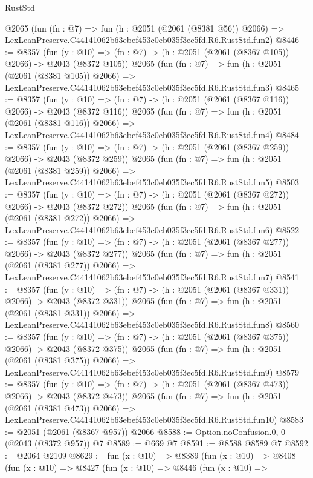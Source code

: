 \begin{lexlean}{RustStd}
\begin{coremodule}
    @2065
    (fun (fn : @7) =>
    fun (h : @2051 (@2061 (@8381 @56)) @2066) =>
    LexLeanPreserve.C44141062b63ebef453c0eb035f3ec5fd.R6.RustStd.fun2)
@8446 := @8357
    (fun (y : @10) => (fn : @7) -> (h : @2051 (@2061 (@8367 @105)) @2066) -> @2043 (@8372 @105))
    @2065
    (fun (fn : @7) =>
    fun (h : @2051 (@2061 (@8381 @105)) @2066) =>
    LexLeanPreserve.C44141062b63ebef453c0eb035f3ec5fd.R6.RustStd.fun3)
@8465 := @8357
    (fun (y : @10) => (fn : @7) -> (h : @2051 (@2061 (@8367 @116)) @2066) -> @2043 (@8372 @116))
    @2065
    (fun (fn : @7) =>
    fun (h : @2051 (@2061 (@8381 @116)) @2066) =>
    LexLeanPreserve.C44141062b63ebef453c0eb035f3ec5fd.R6.RustStd.fun4)
@8484 := @8357
    (fun (y : @10) => (fn : @7) -> (h : @2051 (@2061 (@8367 @259)) @2066) -> @2043 (@8372 @259))
    @2065
    (fun (fn : @7) =>
    fun (h : @2051 (@2061 (@8381 @259)) @2066) =>
    LexLeanPreserve.C44141062b63ebef453c0eb035f3ec5fd.R6.RustStd.fun5)
@8503 := @8357
    (fun (y : @10) => (fn : @7) -> (h : @2051 (@2061 (@8367 @272)) @2066) -> @2043 (@8372 @272))
    @2065
    (fun (fn : @7) =>
    fun (h : @2051 (@2061 (@8381 @272)) @2066) =>
    LexLeanPreserve.C44141062b63ebef453c0eb035f3ec5fd.R6.RustStd.fun6)
@8522 := @8357
    (fun (y : @10) => (fn : @7) -> (h : @2051 (@2061 (@8367 @277)) @2066) -> @2043 (@8372 @277))
    @2065
    (fun (fn : @7) =>
    fun (h : @2051 (@2061 (@8381 @277)) @2066) =>
    LexLeanPreserve.C44141062b63ebef453c0eb035f3ec5fd.R6.RustStd.fun7)
@8541 := @8357
    (fun (y : @10) => (fn : @7) -> (h : @2051 (@2061 (@8367 @331)) @2066) -> @2043 (@8372 @331))
    @2065
    (fun (fn : @7) =>
    fun (h : @2051 (@2061 (@8381 @331)) @2066) =>
    LexLeanPreserve.C44141062b63ebef453c0eb035f3ec5fd.R6.RustStd.fun8)
@8560 := @8357
    (fun (y : @10) => (fn : @7) -> (h : @2051 (@2061 (@8367 @375)) @2066) -> @2043 (@8372 @375))
    @2065
    (fun (fn : @7) =>
    fun (h : @2051 (@2061 (@8381 @375)) @2066) =>
    LexLeanPreserve.C44141062b63ebef453c0eb035f3ec5fd.R6.RustStd.fun9)
@8579 := @8357
    (fun (y : @10) => (fn : @7) -> (h : @2051 (@2061 (@8367 @473)) @2066) -> @2043 (@8372 @473))
    @2065
    (fun (fn : @7) =>
    fun (h : @2051 (@2061 (@8381 @473)) @2066) =>
    LexLeanPreserve.C44141062b63ebef453c0eb035f3ec5fd.R6.RustStd.fun10)
@8583 := @2051 (@2061 (@8367 @957)) @2066
@8588 := Option.noConfusion.{0, 0} (@2043 (@8372 @957)) @7
@8589 := @669 @7
@8591 := @8588 @8589 @7
@8592 := @2064 @2109
@8629 := fun (x : @10) =>
  @8389
    (fun (x : @10) =>
    @8408
      (fun (x : @10) =>
      @8427
        (fun (x : @10) =>
        @8446
          (fun (x : @10) =>

\end{coremodule}
\end{lexlean}
